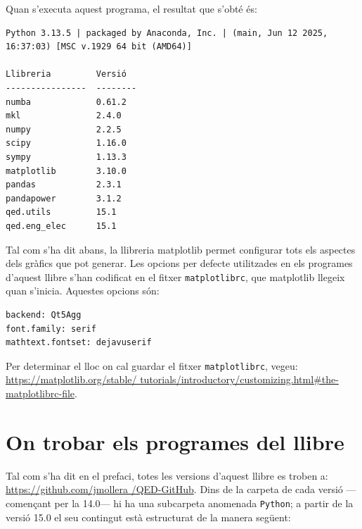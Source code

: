 Quan s'executa aquest programa, el resultat que s'obté és:
\lstset{
	language=,
	numbers=none,
	frame=none
}

\begin{lstlisting}
Python 3.13.5 | packaged by Anaconda, Inc. | (main, Jun 12 2025, 16:37:03) [MSC v.1929 64 bit (AMD64)] 

Llibreria         Versió
----------------  --------
numba             0.61.2
mkl               2.4.0
numpy             2.2.5
scipy             1.16.0
sympy             1.13.3
matplotlib        3.10.0
pandas            2.3.1
pandapower        3.1.2
qed.utils         15.1
qed.eng_elec      15.1
\end{lstlisting} 


Tal com s'ha dit abans, la llibreria matplotlib permet configurar tots els aspectes dels gràfics que pot generar. Les opcions per defecte utilitzades en els programes d'aquest llibre s'han codificat en el fitxer \texttt{matplotlibrc}, que matplotlib llegeix quan s'inicia. Aquestes opcions són:
\begin{lstlisting}
backend: Qt5Agg
font.family: serif
mathtext.fontset: dejavuserif
\end{lstlisting} 

Per determinar el lloc on cal guardar el fitxer \texttt{matplotlibrc}, vegeu: \href{https://matplotlib.org/stable/tutorials/introductory/customizing.html#the-matplotlibrc-file}{https:/\!\!/matplotlib.org/stable/ tutorials/introductory/customizing.html\#the-matplotlibrc-file}.



\section{On trobar els programes del llibre}\label{sec:progs-llibre-internet}

Tal com s'ha dit en el prefaci, totes les versions d'aquest llibre es troben a:
\href{https://github.com/jmollera/QED-GitHub}{https:/\!\!/github.com/jmollera
/QED-GitHub}.  Dins de la carpeta de cada versió ---començant per la 14.0--- hi ha una subcarpeta anomenada \texttt{Python}; a partir de la versió 15.0  el seu contingut està estructurat de la manera següent: 
 
